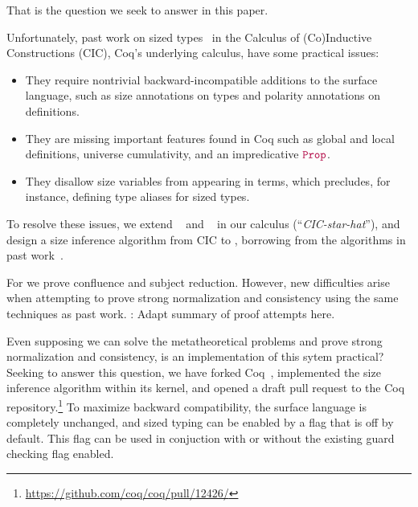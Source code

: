 \noindent That is the question we seek to answer in this paper.

Unfortunately, past work on sized types~\citep{cic-hat, cic-hat-minus} in the Calculus of (Co)\-Inductive Constructions (CIC), Coq's underlying calculus, have some practical issues:

\begin{itemize}
    \item They require nontrivial backward-incompatible additions to the surface language,
      such as size annotations on \cofixpoint types and polarity annotations on \coinductive definitions.
    \item They are missing important features found in Coq such as global and local definitions,
      universe cumulativity, and an impredicative $\Prop$.
    \item They disallow size variables from appearing in terms, which precludes, for instance,
      defining type aliases for sized types.
\end{itemize}

To resolve these issues, we extend \CIChat~\citep{cic-hat} and \CIChatminus~\citep{cic-hat-minus-nat,cic-hat-minus} in our calculus \textbf{\lang} (``\emph{CIC-star-hat}''),
and design a size inference algorithm from CIC to \lang,
borrowing from the algorithms in past work~\citep{f-hat, cic-hat, cc-hat-omega}.

For \lang we prove confluence and subject reduction.
However, new difficulties arise when attempting to prove strong normalization and consistency using the same techniques as past work.
\todo: Adapt summary of proof attempts here.

\iffalse
However, in attempting to recover backward-compatibility and the entire feature set of Coq,
we run into new theoretical problems.
Proving strong normalization and consistency of the new language becomes difficult compared to pure CIC, for reasons that seem intrinsic.
Some of the design goals of CIC --- untyped reduction, orthogonality to classical axioms --- seem at odds with set theoretical models that include sized types.
Some of these might be solvable if we could sacrifice backward compatibility.
Even if they are solvable, the complexity of these models would at least sacrifice trust in the core of Coq.
We discuss our models and the meta-theory of \lang in detail.
\fi

Even supposing we can solve the metatheoretical problems and prove strong normalization and consistency,
is an implementation of this sytem practical?
Seeking to answer this question, we have forked Coq~\citep{impl}, implemented the size inference algorithm within its kernel,
and opened a draft pull request to the Coq repository.\footnote{\url{https://github.com/coq/coq/pull/12426/}}
To maximize backward compatibility, the surface language is completely unchanged,
and sized typing can be enabled by a flag that is off by default.
This flag can be used in conjuction with or without the existing guard checking flag enabled.

